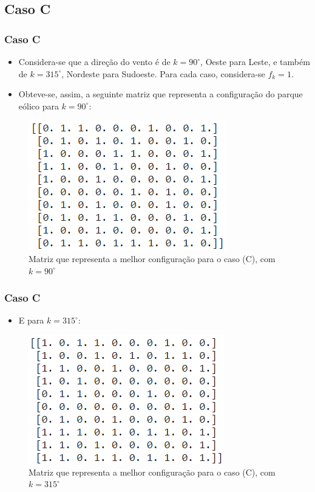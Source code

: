 \documentclass{beamer}
\begin{document}
	\subsection{Caso C}
	\begin{frame}
		\frametitle{Caso C}
		\begin{itemize}
			\item Considera-se que a direção do vento é de $ k = 90^{\circ} $,  Oeste para Leste, e também de $ k =  315^{\circ} $, Nordeste para Sudoeste. Para cada caso, considera-se $ f_k = 1 $.
			\item Obteve-se, assim, a seguinte matriz que representa a configuração do parque eólico para $ k = 90^{\circ} $:
		\end{itemize}
		\begin{figure}[H]
			\centering
			\includegraphics[width=0.5\linewidth]{caso_c_90}
			\caption{Matriz que representa a melhor configuração para o caso (C), com $ k = 90^{\circ} $}
			\label{fig:casoc90}
		\end{figure}
	\end{frame}

	\begin{frame}
		\frametitle{Caso C}
		\begin{itemize}
			\item E para $ k = 315^{\circ} $:
		\end{itemize}
		\begin{figure}[H]
			\centering
			\includegraphics[width=0.5\linewidth]{caso_c_315}
			\caption{Matriz que representa a melhor configuração para o caso (C), com $ k = 315^{\circ} $}
			\label{fig:casoc315}
		\end{figure}
	\end{frame}
	
\end{document}
